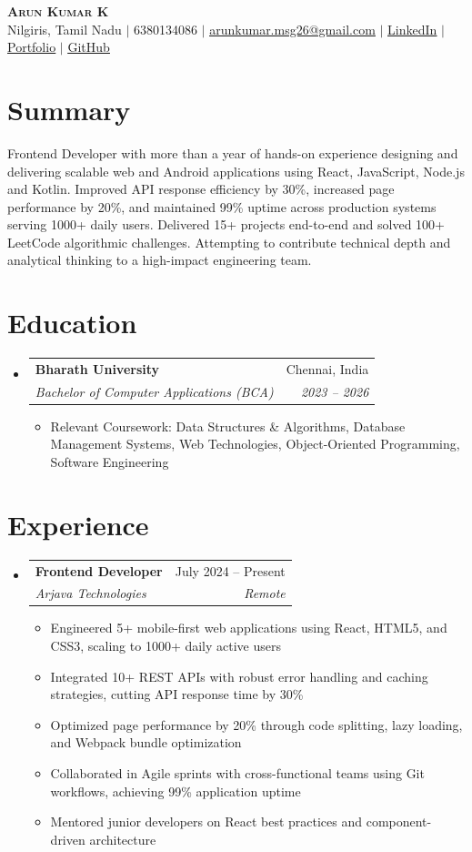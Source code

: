 \documentclass[letterpaper,10pt]{article}
\makeatletter
\newcommand{\resumeItem}[1]{
  \item\small{{#1 \vspace{-2pt}}}
}
\newcommand{\resumeSubheading}[4]{
  \vspace{-2pt}\item
    \begin{tabular*}{0.97\textwidth}[t]{l@{\extracolsep{\fill}}r}
      \textbf{#1} & #2 \\
      \textit{\small#3} & \textit{\small #4} \\
    \end{tabular*}\vspace{-7pt}
}
\newcommand{\resumeSubHeadingListStart}{\begin{itemize}[leftmargin=0.15in, label={}]}
\newcommand{\resumeSubHeadingListEnd}{\end{itemize}}
\newcommand{\resumeItemListStart}{\begin{itemize}[leftmargin=0.2in]\vspace{-2pt}}
\newcommand{\resumeItemListEnd}{\end{itemize}\vspace{-4pt}}
\makeatother
\begin{document}
\begin{center}
    \textbf{\Huge \scshape Arun Kumar K} \\ \vspace{2pt}
    \small Nilgiris, Tamil Nadu $|$
    6380134086 $|$
    \href{mailto:arunkumar.msg26@gmail.com}{\underline{arunkumar.msg26@gmail.com}} $|$
    \href{https://www.linkedin.com/in/arun-kumar-862981293}{\underline{LinkedIn}} $|$
    \href{https://arunkumar-arjava.github.io/portfolio/}{\underline{Portfolio}} $|$
    \href{https://github.com/Arunkumar-Arjava}{\underline{GitHub}}
\end{center}

\section{Summary}
  \small{Frontend Developer with more than a year of hands-on experience designing and delivering scalable web and Android applications using React, JavaScript, Node.js and Kotlin. Improved API response efficiency by 30\%, increased page performance by 20\%, and maintained 99\% uptime across production systems serving 1000+ daily users. Delivered 15+ projects end-to-end and solved 100+ LeetCode algorithmic challenges. Attempting to contribute technical depth and analytical thinking to a high-impact engineering team.}

\section{Education}
  \resumeSubHeadingListStart
    \resumeSubheading
      {Bharath University}{Chennai, India}
      {Bachelor of Computer Applications (BCA)}{2023 -- 2026}
      \resumeItemListStart
        \resumeItem{Relevant Coursework: Data Structures \& Algorithms, Database Management Systems, Web Technologies, Object-Oriented Programming, Software Engineering}
      \resumeItemListEnd
  \resumeSubHeadingListEnd

\section{Experience}
  \resumeSubHeadingListStart
    \resumeSubheading
      {Frontend Developer}{July 2024 -- Present}
      {Arjava Technologies}{Remote}
      \resumeItemListStart
        \resumeItem{Engineered 5+ mobile-first web applications using React, HTML5, and CSS3, scaling to 1000+ daily active users}
        \resumeItem{Integrated 10+ REST APIs with robust error handling and caching strategies, cutting API response time by 30\%}
        \resumeItem{Optimized page performance by 20\% through code splitting, lazy loading, and Webpack bundle optimization}
        \resumeItem{Collaborated in Agile sprints with cross-functional teams using Git workflows, achieving 99\% application uptime}
        \resumeItem{Mentored junior developers on React best practices and component-driven architecture}
      \resumeItemListEnd
  \resumeSubHeadingListEnd
\end{document}
